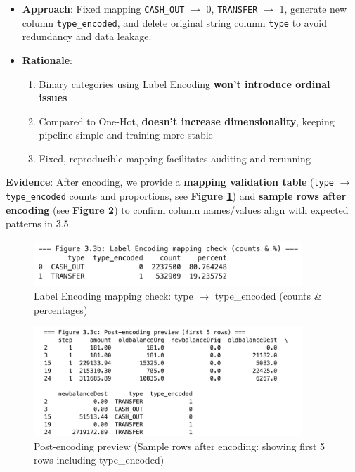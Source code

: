 \documentclass[sigplan,screen]{acmart}
\begin{document}
\begin{itemize}
    \item \textbf{Approach}: Fixed mapping \texttt{CASH\_OUT} $\rightarrow$ 0, \texttt{TRANSFER} $\rightarrow$ 1, generate new column \texttt{type\_encoded}, and delete original string column \texttt{type} to avoid redundancy and data leakage.
    \item \textbf{Rationale}:
\begin{enumerate}
        \item Binary categories using Label Encoding \textbf{won't introduce ordinal issues}
        \item Compared to One-Hot, \textbf{doesn't increase dimensionality}, keeping pipeline simple and training more stable
        \item Fixed, reproducible mapping facilitates auditing and rerunning
\end{enumerate}
\end{itemize}

\textbf{Evidence}: After encoding, we provide a \textbf{mapping validation table} (\texttt{type} $\rightarrow$ \texttt{type\_encoded} counts and proportions, see \textbf{Figure \ref{fig:encoding_validation}}) and \textbf{sample rows after encoding} (see \textbf{Figure \ref{fig:encoding_sample}}) to confirm column names/values align with expected patterns in 3.5.

\begin{figure}[h!]
    \centering
    \includegraphics[width=0.9\textwidth]{3.3b.png}
    \caption{Label Encoding mapping check: type $\rightarrow$ type\_encoded (counts \& percentages)}
    \label{fig:encoding_validation}
\end{figure}

\begin{figure}[h!]
    \centering
    \includegraphics[width=0.9\textwidth]{3.3c.png}
    \caption{Post-encoding preview (Sample rows after encoding: showing first 5 rows including type\_encoded)}
    \label{fig:encoding_sample}
\end{figure}
\end{document}
